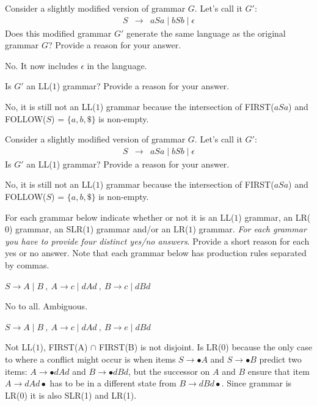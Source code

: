 \documentclass[12pt]{article}
\begin{document}
\begin{exe}
\begin{xlist}
    {\ex Consider a slightly modified version of grammar $G$. Let's
      call it $G'$:
      \begin{eqnarray}
        S & \rightarrow & aSa \mid bSb \mid \epsilon \nonumber
      \end{eqnarray}
      Does this modified grammar $G'$ generate the same language as
      the original grammar $G$? Provide a reason for your answer.
      \begin{soln}
        No. It now includes $\epsilon$ in the language.
      \end{soln}
    }
    
    {\ex  Is $G'$ an LL($1$) grammar? Provide a reason for your answer.
      \begin{soln}
        No, it is still not an LL($1$) grammar because the intersection
        of FIRST($aSa$) and FOLLOW($S$) = $\{ a, b, \$ \}$ is
        non-empty.
      \end{soln}
    }
    {\ex  Consider a slightly modified version of grammar $G$. Let's
      call it $G'$:
      \begin{eqnarray}
        S & \rightarrow & aSa \mid bSb \mid \epsilon \nonumber
      \end{eqnarray}
     Is $G'$ an LL($1$) grammar? Provide a reason for your answer.
      \begin{soln}
        No, it is still not an LL($1$) grammar because the intersection
        of FIRST($aSa$) and FOLLOW($S$) = $\{ a, b, \$ \}$ is
        non-empty.
      \end{soln}
    }
  \end{xlist}

\newpage
  \ex\label{lrgram}  For each grammar below indicate whether or
  not it is an LL($1$) grammar, an LR($0$) grammar, an SLR($1$)
  grammar and/or an LR($1$) grammar. \textit{For each grammar you have to
  provide four distinct yes/no answers}. 
  Provide a short reason for each yes or no answer. Note that
  each grammar below has production rules separated by commas.

  \begin{xlist}

    {\ex \( S \rightarrow A \mid B\ ,\ A \rightarrow c \mid dAd\ ,\ B
      \rightarrow c \mid dBd \) 
      \begin{soln}
        No to all. Ambiguous.
      \end{soln}
    }

    {\ex \( S \rightarrow A \mid B\ ,\ A \rightarrow c \mid dAd\ ,\ B
      \rightarrow e \mid dBd \) 
      \begin{soln}
        Not LL($1$), FIRST(A) $\cap$ FIRST(B) is not disjoint. Is LR(0)
        because the only case to where a conflict might occur is when
        items $S \rightarrow \bullet A$ and $S \rightarrow \bullet B$ predict
        two items: $A \rightarrow \bullet d A d$ and $B \rightarrow
        \bullet d B d$, but the successor on $A$ and $B$ ensure that
        item $A \rightarrow d A d \bullet$ has to be in a different state
        from $B \rightarrow d B d \bullet$. Since grammar is LR(0) it 
        is also SLR(1) and LR(1).
      \end{soln}
    }


\end{xlist}
\end{exe}
\end{document}
